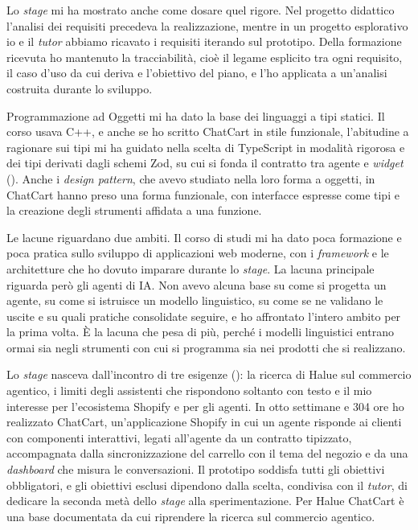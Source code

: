 Lo \emph{stage} mi ha mostrato anche come dosare quel rigore. Nel progetto didattico l’analisi dei
requisiti precedeva la realizzazione, mentre in un progetto esplorativo io e il \emph{tutor} abbiamo
ricavato i requisiti iterando sul prototipo. Della formazione ricevuta ho mantenuto la
tracciabilità, cioè il legame esplicito tra ogni requisito, il caso d’uso da cui deriva e
l’obiettivo del piano, e l’ho applicata a un’analisi costruita durante lo sviluppo.

Programmazione ad Oggetti mi ha dato la base dei linguaggi a tipi statici. Il corso usava C++, e
anche se ho scritto ChatCart in stile funzionale, l’abitudine a ragionare sui tipi mi ha guidato
nella scelta di TypeScript in modalità rigorosa e dei tipi derivati dagli schemi Zod, su cui si
fonda il contratto tra agente e \emph{widget} (). Anche i \emph{design
pattern}, che avevo studiato nella loro forma a oggetti, in ChatCart hanno preso una forma
funzionale, con interfacce espresse come tipi e la creazione degli strumenti affidata a una
funzione.

Le lacune riguardano due ambiti. Il corso di studi mi ha dato poca formazione e poca pratica sullo
sviluppo di applicazioni web moderne, con i \emph{framework} e le architetture che ho dovuto
imparare durante lo \emph{stage}. La lacuna principale riguarda però gli agenti di IA. Non avevo
alcuna base su come si progetta un agente, su come si istruisce un modello linguistico, su come se
ne validano le uscite e su quali pratiche consolidate seguire, e ho affrontato l’intero ambito per
la prima volta. È la lacuna che pesa di più, perché i modelli linguistici entrano ormai sia negli
strumenti con cui si programma sia nei prodotti che si realizzano.

Lo \emph{stage} nasceva dall’incontro di tre esigenze (): la ricerca
di Halue sul commercio agentico, i limiti degli assistenti che rispondono soltanto con testo e il
mio interesse per l’ecosistema Shopify e per gli agenti. In otto settimane e 304 ore ho realizzato
ChatCart, un’applicazione Shopify in cui un agente risponde ai clienti con componenti interattivi,
legati all’agente da un contratto tipizzato, accompagnata dalla sincronizzazione del carrello con il
tema del negozio e da una \emph{dashboard} che misura le conversazioni. Il prototipo soddisfa tutti
gli obiettivi obbligatori, e gli obiettivi esclusi dipendono dalla scelta, condivisa con il
\emph{tutor}, di dedicare la seconda metà dello \emph{stage} alla sperimentazione. Per Halue
ChatCart è una base documentata da cui riprendere la ricerca sul commercio agentico.


